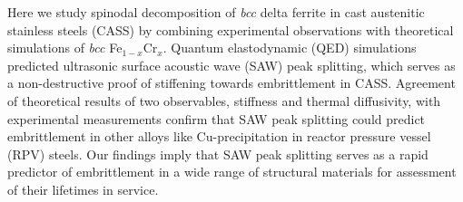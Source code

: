 %
%
%
%
%
%
%
%
%
%
%

Here we study spinodal decomposition of \emph{bcc} delta ferrite in cast austenitic stainless steels (CASS) by combining experimental observations with theoretical simulations of \emph{bcc} Fe$_{1-x}$Cr$_{x}$. Quantum elastodynamic (QED) simulations predicted ultrasonic surface acoustic wave (SAW) peak splitting, which serves as a non-destructive proof of stiffening towards embrittlement in CASS. Agreement of theoretical results of two observables, stiffness and thermal diffusivity, with experimental measurements confirm that SAW peak splitting could predict embrittlement in other alloys like Cu-precipitation in reactor pressure vessel (RPV) steels. Our findings imply that SAW peak splitting serves as a rapid predictor of embrittlement in a wide range of structural materials for assessment of their lifetimes in service.